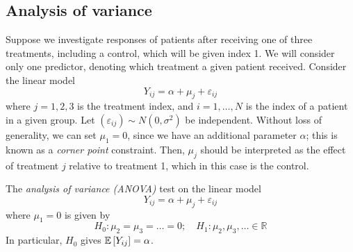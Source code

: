 \subsection{Analysis of variance}
Suppose we investigate responses of patients after receiving one of three treatments, including a control, which will be given index 1.
We will consider only one predictor, denoting which treatment a given patient received.
Consider the linear model
\[
	Y_{ij} = \alpha + \mu_j + \varepsilon_{ij}
\]
where \( j = 1, 2, 3 \) is the treatment index, and \( i = 1, \dots, N \) is the index of a patient in a given group.
Let \( (\varepsilon_{ij}) \sim N(0, \sigma^2) \) be independent.
Without loss of generality, we can set \( \mu_1 = 0 \), since we have an additional parameter \( \alpha \); this is known as a \textit{corner point} constraint.
Then, \( \mu_j \) should be interpreted as the effect of treatment \( j \) relative to treatment 1, which in this case is the control.

\begin{definition}
	The \textit{analysis of variance (ANOVA)} test on the linear model
	\[
		Y_{ij} = \alpha + \mu_j + \varepsilon_{ij}
	\]
	where \( \mu_1 = 0 \) is given by
	\[
		H_0 \colon \mu_2 = \mu_3 = \dots = 0;\quad H_1 \colon \mu_2, \mu_3, \dots \in \mathbb R
	\]
	In particular, \( H_0 \) gives \( \mathbb{E}\left[{Y_{ij}}\right] = \alpha \).
\end{definition}

